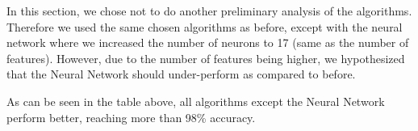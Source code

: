 In this section, we chose not to do another preliminary analysis of the algorithms. Therefore we used the same chosen algorithms as before, except with the neural network where we increased the number of neurons to 17 (same as the number of features). However, due to the number of features being higher, we hypothesized that the Neural Network should under-perform as compared to before.
\begin{table}[!h]

    \vspace{0.2cm}
    \caption{Accuracy of the 4 selected algorithms on 4FG associated data.}
    \label{tab:selected_algs2}
\end{table}

As can be seen in the table above, all algorithms except the Neural Network perform better, reaching more than 98\% accuracy. 


